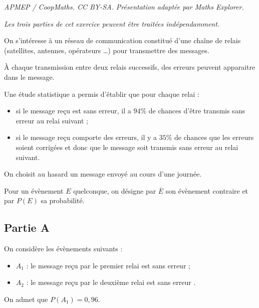 \documentclass[10pt]{article}
\begin{document}
\noindent\textit{APMEP / CoopMaths. CC BY-SA. Présentation adaptée par Maths Explorer.}\par\medskip
\emph{Les trois parties de cet exercice peuvent être traitées indépendamment.}

	\medskip

	On s'intéresse à un réseau de communication constitué d'une chaîne de relais (satellites, antennes, opérateurs \dots) pour transmettre des messages.

	\smallskip

	À chaque transmission entre deux relais successifs, des erreurs peuvent apparaitre dans le message.

	Une étude statistique a permis d'établir que pour chaque relai :
	\begin{itemize}[topsep=0pt]
		\item si le message reçu est sans erreur, il a $94 \%$ de chances d'être transmis sans erreur au relai suivant ;
		\item si le message reçu comporte des erreurs, il y a $35 \%$ de chances que les erreurs soient corrigées et donc que le message soit transmis sans erreur au relai suivant.
	\end{itemize}

	\smallskip

	On choisit au hasard un message envoyé au cours d'une journée.

	\smallskip

	Pour un évènement $E$ quelconque, on désigne par $\overline{E}$ son évènement contraire et par $P(E)$ sa probabilité.

	\subsection*{Partie A}
		On considère les évènements suivants :

		\begin{itemize}[leftmargin=10mm]
			\item $A_{1}$ : \og le message reçu par le premier relai est sans erreur \fg{} ;
			\item $A_{2}$ : \og le message reçu par le deuxième relai est sans erreur \fg{}.
		\end{itemize}

		On admet que $P\left(A_{1}\right)=0,96$.

		\medskip
\end{document}
